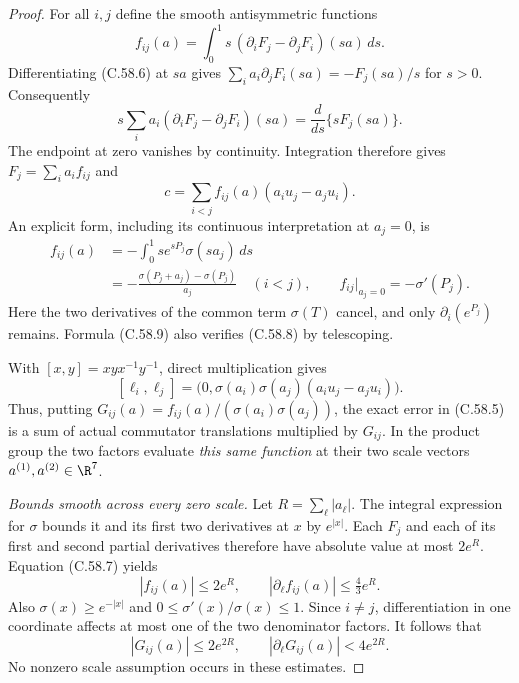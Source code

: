 \begin{proof}
For all $i,j$ define the smooth antisymmetric functions
\[
 f_{ij}(a)=\int_0^1 s\,
       (\partial_iF_j-\partial_jF_i)(sa)\,ds.
                                                               \tag{C.58.7}
\]
Differentiating (C.58.6) at $sa$ gives
$\sum_i a_i\partial_jF_i(sa)=-F_j(sa)/s$ for $s>0$.
Consequently
\[
 s\sum_i a_i(\partial_iF_j-\partial_jF_i)(sa)
                   =\frac{d}{ds}\{sF_j(sa)\}.
 \]
The endpoint at zero vanishes by continuity.
Integration therefore gives $F_j=\sum_i a_if_{ij}$ and
\[
 c=\sum_{i<j}f_{ij}(a)(a_i u_j-a_j u_i).                \tag{C.58.8}
\]
An explicit form, including its continuous interpretation
at $a_j=0$, is
\[
 \begin{split}
 f_{ij}(a)
   &=-\int_0^1s e^{sP_j}\sigma(sa_j)\,ds\\
   &=-\frac{\sigma(P_j+a_j)-\sigma(P_j)}{a_j}
          \quad(i<j),\qquad
 f_{ij}\big|_{a_j=0}=-\sigma'(P_j).
 \end{split}                                            \tag{C.58.9}
\]
Here the two derivatives of the common term $\sigma(T)$
cancel, and only $\partial_i(e^{P_j})$ remains.
Formula (C.58.9) also verifies (C.58.8) by telescoping.

With $[x,y]=xyx^{-1}y^{-1}$, direct multiplication gives
\[
 [\ell_i,\ell_j]
  =\bigl(0,\sigma(a_i)\sigma(a_j)
                         (a_i u_j-a_j u_i)\bigr).
                                                               \tag{C.58.10}
\]
Thus, putting
$G_{ij}(a)=f_{ij}(a)/(\sigma(a_i)\sigma(a_j))$,
the exact error in (C.58.5) is a sum of actual
commutator translations multiplied by $G_{ij}$.
In the product group the two factors evaluate
\emph{this same function} at their two scale vectors
$a^{(1)},a^{(2)}\in\R^7$.

\emph{Bounds smooth across every zero scale.}
Let $R=\sum_\ell|a_\ell|$.
The integral expression for $\sigma$ bounds it and its
first two derivatives at $x$ by $e^{|x|}$.
Each $F_j$ and each of its first and second partial
derivatives therefore have absolute value at most $2e^R$.
Equation (C.58.7) yields
\[
 |f_{ij}(a)|\leq2e^R,\qquad
 |\partial_\ell f_{ij}(a)|\leq\tfrac43e^R.
 \]
Also
$\sigma(x)\geq e^{-|x|}$ and
$0\leq\sigma'(x)/\sigma(x)\leq1$.
Since $i\ne j$, differentiation in one coordinate
affects at most one of the two denominator factors.
It follows that
\[
 |G_{ij}(a)|\leq2e^{2R},\qquad
                 |\partial_\ell G_{ij}(a)|<4e^{2R}.
                                                               \tag{C.58.11}
\]
No nonzero scale assumption occurs in these estimates.


\end{proof}

